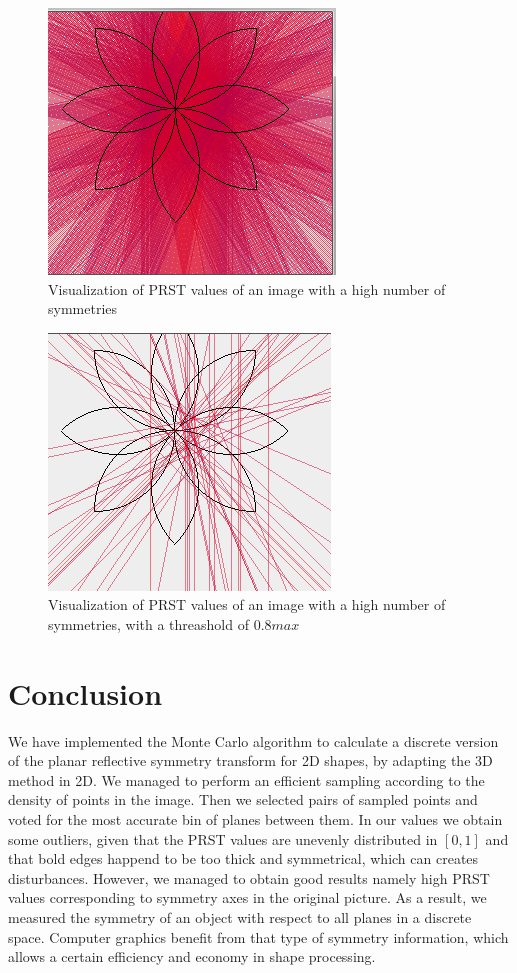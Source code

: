 \documentclass[10pt,a4paper]{article}                        %
\begin{document}
\begin{figure}[h]
\centering
 \includegraphics[scale = 0.7]{img/rosace_5000.png}
 \caption{Visualization of PRST values of an image with a high number of symmetries}
 \label{rosace}
\end{figure}


\begin{figure}[h!]
\centering
 \includegraphics[scale = 0.7]{img/rosace_2000_seuil08.png}
 \caption{Visualization of PRST values of an image with a high number of symmetries, with a threashold of $0.8max$}
 \label{rosace 2}
\end{figure}

        \section*{Conclusion}
We have implemented the Monte Carlo algorithm to calculate a discrete version of the planar reflective symmetry transform for 2D shapes, by adapting the 3D method in 2D. We managed to perform an efficient sampling according to the density of points in the image. Then we selected pairs of sampled points and voted for the most accurate bin of planes between them. In our values we obtain some outliers, given that the PRST values are unevenly distributed in $[0,1]$ and that bold edges happend to be too thick and symmetrical, which can creates disturbances. However, we managed to obtain good results namely high PRST values corresponding to symmetry axes in the original picture. As a result, we measured the symmetry of an object with respect to all planes in a discrete space. Computer graphics benefit from that type of symmetry information, which allows a certain efficiency and economy in shape processing.

\nocite{*}


                
\end{document}
